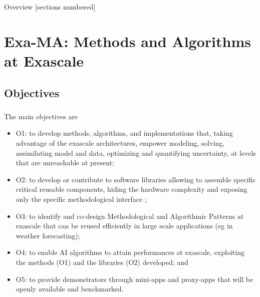 \titleframe

\begin{frame}{Overview}
  [sections numbered]
  \tableofcontents[hideallsubsections]
\end{frame}


\section{Exa-MA: Methods and Algorithms at Exascale}

\subsection{Objectives}

\begin{frame}
  \frametitle{\insertsectionhead}
  \framesubtitle{\insertsubsectionhead}
\footnotesize
The   main objectives are
\begin{itemize}
  \item O1: to develop methods, algorithms, and implementations that, taking advantage of the exascale architectures, empower modeling, solving, assimilating model and data, optimizing and quantifying uncertainty, at levels that are unreachable at present; 
  \item O2: to develop or contribute to software libraries allowing to assemble specific critical reusable components, hiding the hardware complexity and exposing only the specific methodological interface ;
  \item O3: to identify and co-design Methodological and Algorithmic Patterns at exascale that can be reused efficiently in large scale applications (eg in weather forecasting); 
  \item O4: to enable AI algorithms to attain performances at exascale, exploiting the methods (O1) and the libraries (O2) developed; and
  \item O5: to provide demonstrators through mini-apps and proxy-apps that will be openly available and benchmarked.
\end{itemize}


\end{frame}

